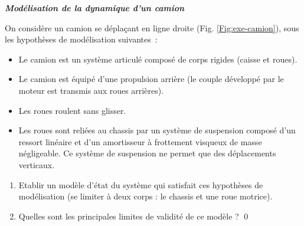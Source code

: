 \begin{exercice}{\bf \em Modélisation de la dynamique d'un camion}

On considère un camion se dépla\c cant en ligne droite (Fig. \ref{Fig:exe-camion}), sous les hypothèses de modélisation suivantes~:
\begin{itemize}
\item[a)] Le camion est un système articulé composé de corps rigides (caisse et
roues).
\item[b)] Le camion est équipé d'une propulsion arrière (le couple développé par
le moteur est transmis aux roues arrières).
\item[c)] Les roues roulent sans glisser.
\item[d)] Les roues sont reliées au chassis par un système de suspension composé
d'un ressort linéaire et d'un amortisseur à frottement visqueux de masse
négligeable.  Ce système de suspension ne permet que des déplacements verticaux.
\end{itemize}
\begin{enumerate}
\item Etablir un modèle d'état du système qui satisfait ces hypothèses de
modélisation (se limiter à deux corps : le chassis et une roue motrice).
\item Quelles sont les principales limites de validité de ce modèle ? \qed
\end{enumerate}
\end{exercice}
\vv

